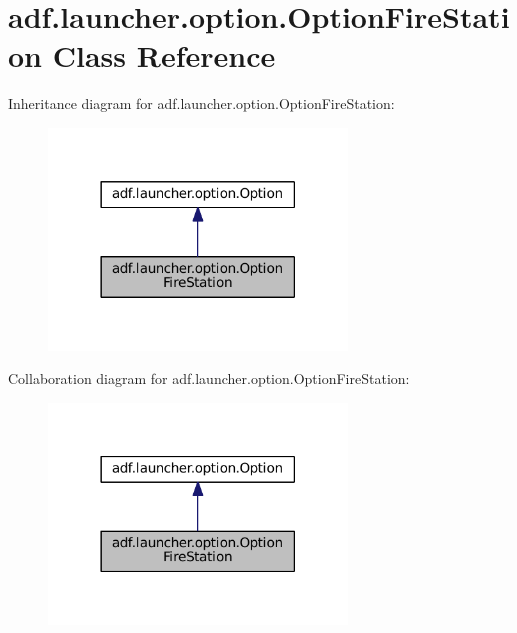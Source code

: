 \hypertarget{classadf_1_1launcher_1_1option_1_1OptionFireStation}{}\section{adf.\+launcher.\+option.\+Option\+Fire\+Station Class Reference}
\label{classadf_1_1launcher_1_1option_1_1OptionFireStation}


Inheritance diagram for adf.\+launcher.\+option.\+Option\+Fire\+Station\+:
\nopagebreak
\begin{figure}[H]
\begin{center}
\leavevmode
\includegraphics[width=225pt]{classadf_1_1launcher_1_1option_1_1OptionFireStation__inherit__graph}
\end{center}
\end{figure}


Collaboration diagram for adf.\+launcher.\+option.\+Option\+Fire\+Station\+:
\nopagebreak
\begin{figure}[H]
\begin{center}
\leavevmode
\includegraphics[width=225pt]{classadf_1_1launcher_1_1option_1_1OptionFireStation__coll__graph}
\end{center}
\end{figure}
